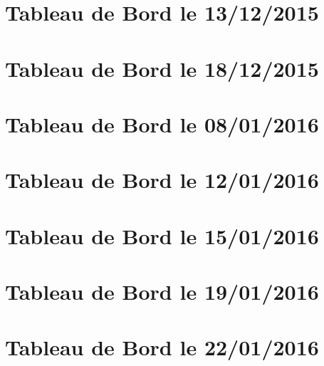 \begin{appendices}

\chapter{Tableau de Bord le 13/12/2015}


\chapter{Tableau de Bord le 18/12/2015}


\chapter{Tableau de Bord le 08/01/2016}


\chapter{Tableau de Bord le 12/01/2016}


\chapter{Tableau de Bord le 15/01/2016}


\chapter{Tableau de Bord le 19/01/2016}


\chapter{Tableau de Bord le 22/01/2016}


\end{appendices}


